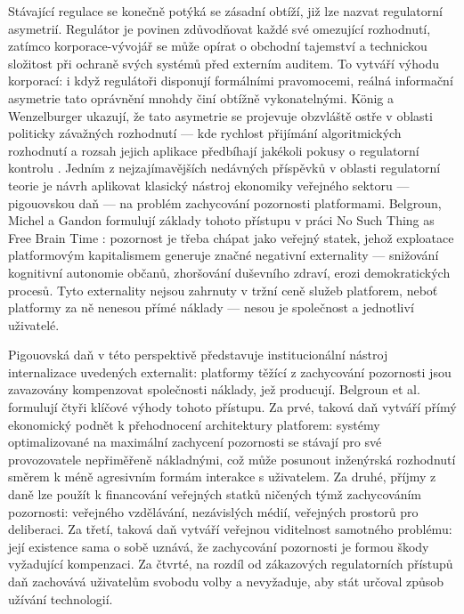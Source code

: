 Stávající regulace se konečně potýká se zásadní obtíží, již lze nazvat regulatorní asymetrií. Regulátor je povinen zdůvodňovat každé své omezující rozhodnutí, zatímco korporace-vývojář se může opírat o obchodní tajemství a technickou složitost při ochraně svých systémů před externím auditem. To vytváří výhodu korporací: i když regulátoři disponují formálními pravomocemi, reálná informační asymetrie tato oprávnění mnohdy činí obtížně vykonatelnými. König a Wenzelburger ukazují, že tato asymetrie se projevuje obzvláště ostře v oblasti politicky závažných rozhodnutí — kde rychlost přijímání algoritmických rozhodnutí a rozsah jejich aplikace předbíhají jakékoli pokusy o regulatorní kontrolu \parencite{KoenigWenzelburger20}.
Jedním z nejzajímavějších nedávných příspěvků v oblasti regulatorní teorie je návrh aplikovat klasický nástroj ekonomiky veřejného sektoru — pigouovskou daň — na problém zachycování pozornosti platformami. Belgroun, Michel a Gandon formulují základy tohoto přístupu v práci No Such Thing as Free Brain Time \parencite{Belgroun25}: pozornost je třeba chápat jako veřejný statek, jehož exploatace platformovým kapitalismem generuje značné negativní externality — snižování kognitivní autonomie občanů, zhoršování duševního zdraví, erozi demokratických procesů. Tyto externality nejsou zahrnuty v tržní ceně služeb platforem, neboť platformy za ně nenesou přímé náklady — nesou je společnost a jednotliví uživatelé.

Pigouovská daň v této perspektivě představuje institucionální nástroj internalizace uvedených externalit: platformy těžící z zachycování pozornosti jsou zavazovány kompenzovat společnosti náklady, jež producují. Belgroun et al. formulují čtyři klíčové výhody tohoto přístupu. Za prvé, taková daň vytváří přímý ekonomický podnět k přehodnocení architektury platforem: systémy optimalizované na maximální zachycení pozornosti se stávají pro své provozovatele nepřiměřeně nákladnými, což může posunout inženýrská rozhodnutí směrem k méně agresivním formám interakce s uživatelem. Za druhé, příjmy z daně lze použít k financování veřejných statků ničených týmž zachycováním pozornosti: veřejného vzdělávání, nezávislých médií, veřejných prostorů pro deliberaci. Za třetí, taková daň vytváří veřejnou viditelnost samotného problému: její existence sama o sobě uznává, že zachycování pozornosti je formou škody vyžadující kompenzaci. Za čtvrté, na rozdíl od zákazových regulatorních přístupů daň zachovává uživatelům svobodu volby a nevyžaduje, aby stát určoval  způsob užívání technologií.

